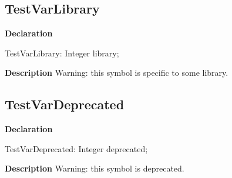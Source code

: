 \documentclass{report}
\begin{document}
\subsection*{TestVarLibrary}
\begin{list}{}{
\setlength{\itemindent}{0cm}
\setlength{\listparindent}{0cm}
\setlength{\leftmargin}{\evensidemargin}
\addtolength{\leftmargin}{\tmplength}
\settowidth{\labelsep}{X}
\addtolength{\leftmargin}{\labelsep}
\setlength{\labelwidth}{\tmplength}
}
\begin{flushleft}
\item[\textbf{Declaration}\hfill]
\begin{ttfamily}
TestVarLibrary: Integer library;\end{ttfamily}


\end{flushleft}
\par
\item[\textbf{Description}]
Warning: this symbol is specific to some library.

 

\end{list}
\subsection*{TestVarDeprecated}
\begin{list}{}{
\setlength{\itemindent}{0cm}
\setlength{\listparindent}{0cm}
\setlength{\leftmargin}{\evensidemargin}
\addtolength{\leftmargin}{\tmplength}
\settowidth{\labelsep}{X}
\addtolength{\leftmargin}{\labelsep}
\setlength{\labelwidth}{\tmplength}
}
\begin{flushleft}
\item[\textbf{Declaration}\hfill]
\begin{ttfamily}
TestVarDeprecated: Integer deprecated;\end{ttfamily}


\end{flushleft}
\par
\item[\textbf{Description}]
Warning: this symbol is deprecated.

 

\end{list}
\end{document}
